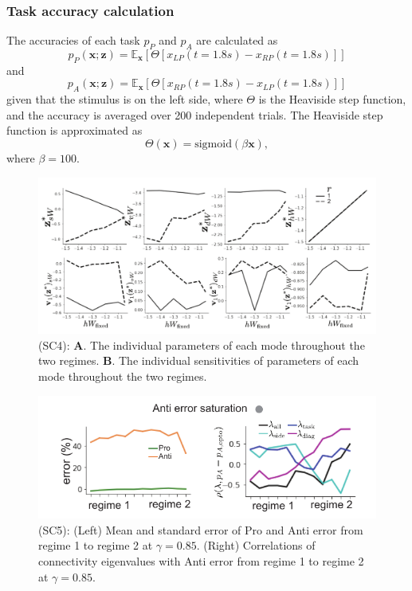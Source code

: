 \documentclass[11pt]{article}
\begin{document}
\subsubsection{Task accuracy calculation} \label{methods_sc_acc}
The accuracies of each task $p_P$ and $p_A$ are calculated as
\begin{equation}
p_P(\mathbf{x}; \mathbf{z}) = \mathbb{E}_{\mathbf{x}}\left[\Theta[x_{LP}(t=1.8s) - x_{RP}(t=1.8s)]\right]
\end{equation}
and 
\begin{equation}
p_A(\mathbf{x}; \mathbf{z}) = \mathbb{E}_{\mathbf{x}}\left[\Theta[x_{RP}(t=1.8s) - x_{LP}(t=1.8s)]\right]
\end{equation}
given that the stimulus is on the left side, where $\Theta$ is the Heaviside step function, and the accuracy is averaged over 200 independent trials.  The Heaviside step function is approximated as
\begin{equation}
\Theta(\mathbf{x}) = \text{sigmoid}(\beta \mathbf{x}),
\end{equation}
where $\beta = 100$.

\begin{figure}
\begin{center}
\includegraphics[scale=0.8]{figures/figSC4/figSC4.pdf}
\end{center}
\caption{\small (SC4):  \textbf{A}. The individual parameters of each mode throughout the two regimes.
\textbf{B}. The individual sensitivities of parameters of each mode throughout the two regimes.
}
\label{fig:SC4}
\end{figure}

\begin{figure}
\begin{center}
\includegraphics[scale=1.2]{figures/figSC5/figSC5.pdf}
\end{center}
\caption{\small (SC5): 
(Left) Mean and standard error of Pro and Anti error from regime 1 to regime 2 at $\gamma = 0.85$.
(Right) Correlations of connectivity eigenvalues with Anti error from regime 1 to regime 2 at $\gamma = 0.85$.
}
\label{fig:SC5}
\end{figure}
\end{document}
